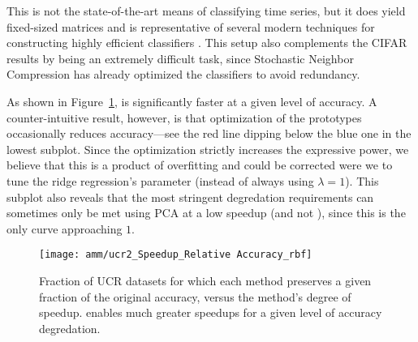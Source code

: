 \vspace{-.5mm}
This is not the state-of-the-art means of classifying time series, but it does yield fixed-sized matrices and is representative of several modern techniques for constructing highly efficient classifiers \cite{snc,dsnc,bnc,protonn}. This setup also complements the CIFAR results by being an extremely difficult task, since Stochastic Neighbor Compression has already optimized the classifiers to avoid redundancy.

\vspace{-.5mm}
As shown in Figure~\ref{fig:ucr}, \oursp is significantly faster at a given level of accuracy. A counter-intuitive result, however, is that optimization of the prototypes occasionally reduces accuracy---see the red line dipping below the blue one in the lowest subplot. Since the optimization strictly increases the expressive power, we believe that this is a product of overfitting and could be corrected were we to tune the ridge regression's parameter (instead of always using $\lambda = 1$).
This subplot also reveals that the most stringent degredation requirements can sometimes only be met using PCA at a low speedup (and not \ours), since this is the only curve approaching $1$.

\begin{figure}[h]
\begin{center}
\texttt{[image: amm/ucr2\_Speedup\_Relative Accuracy\_rbf]}
\vspace*{.25mm}
\caption{Fraction of UCR datasets for which each method preserves a given fraction of the original accuracy, versus the method's degree of speedup. \oursp enables much greater speedups for a given level of accuracy degredation.}
\label{fig:ucr}
\end{center}
\end{figure}

